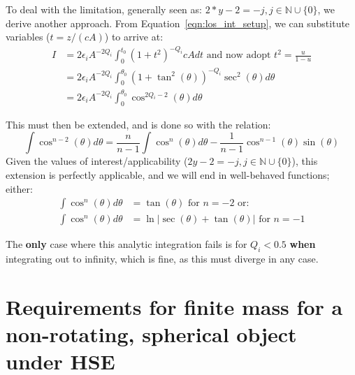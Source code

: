 \documentclass[onecolumn,traditabstract]{aa}
\begin{document}
To deal with the limitation, generally seen as: $2*y-2 = -j, j \in \mathbb{N} \cup \{0\}$, we derive another approach.
From Equation~\ref{eqn:los_int_setup}, we can substitute variables ($t = z / (cA)$) to arrive at:
\begin{align}
  I &= 2 \epsilon_i A^{-2Q_i} \int_{0}^{t_0}(1+t^2)^{-Q_i} c A dt \text{ and now adopt } t^2 = \frac{u}{1-u} \\
    &= 2 \epsilon_i A^{-2Q_i} \int_{0}^{\theta_0}(1+\tan^2(\theta))^{-Q_i} \sec^2(\theta) d\theta \\
    &= 2 \epsilon_i A^{-2Q_i} \int_{0}^{\theta_0}\cos^{2Q_i-2}(\theta) d\theta
\end{align}

This must then be extended, and is done so with the relation:
\begin{equation}
  \int \cos^{n-2}(\theta) d\theta = \frac{n}{n-1}\int \cos^n(\theta)d\theta - \frac{1}{n-1}\cos^{n-1}(\theta)\sin(\theta) 
  \label{eqn:cosext}
\end{equation}
Given the values of interest/applicability ($2y-2 = -j, j \in \mathbb{N} \cup \{0\}$), this extension is perfectly
applicable, and we will end in well-behaved functions; either:
\begin{align*}
  \int \cos^n(\theta)d\theta &= \tan(\theta) \text{ for } n=-2 \text{ or: } \\
  \int \cos^n(\theta)d\theta &= \ln \vert \sec(\theta) + \tan(\theta) \vert \text{ for } n=-1
\end{align*}

The \textbf{only} case where this analytic integration fails is for $Q_i < 0.5$ \textbf{when} integrating out to infinity,
which is fine, as this must diverge in any case. 

\section{Requirements for finite mass for a non-rotating, spherical object under HSE}
\label{sec:finite_mass}
\end{document}
